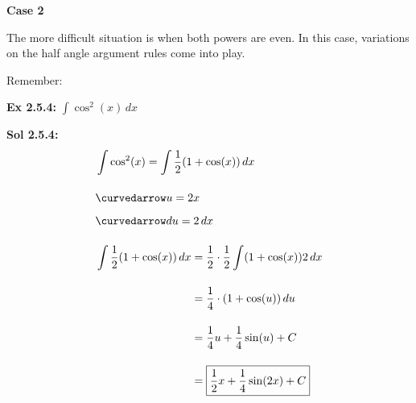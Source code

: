 
\textbf{Case 2} \par

The more difficult situation is when both powers are even. In this case, variations on the half angle argument rules come into play. \par

Remember: \par


\begin{tcolorbox}[example]
    \textbf{Ex 2.5.4: } $\int \cos^2 (x) \, dx$
\end{tcolorbox}
\begin{tcolorbox}[solution]
    \textbf{Sol 2.5.4: } \begin{align*}
        & \int \cos^2 (x) = \int \dfrac{1}{2}(1 + \cos (x)) \, dx \\[11pt]
        & \curvedarrow u = 2x \\[5.5pt]
        & \curvedarrow du = 2 \, dx \\[11pt]
        & \int \dfrac{1}{2}(1 + \cos (x)) \, dx \begin{aligned}[t]
            & = \dfrac{1}{2} \cdot \dfrac{1}{2}\int (1 + \cos (x)) 2 \, dx \\[11pt]
            & = \dfrac{1}{4} \cdot (1 + \cos (u)) \, du \\[11pt]
            & = \dfrac{1}{4}u + \dfrac{1}{4}\sin (u) + C \\[11pt]
            & = \boxed{\dfrac{1}{2}x + \dfrac{1}{4}\sin (2x) + C}
        \end{aligned}
    \end{align*}
\end{tcolorbox}

